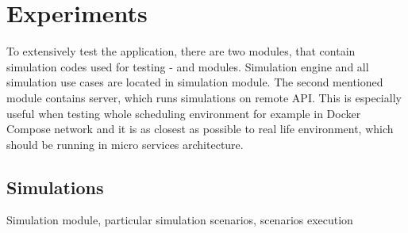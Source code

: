 \chapter{Experiments}\label{c:experiments}

To extensively test the application,
there are two modules, 
that contain simulation codes used for testing -
 and  modules.
Simulation engine and all simulation use cases are located in simulation module.
The second mentioned module contains server, 
which runs simulations on remote API. 
This is especially useful when testing whole scheduling environment for example in Docker Compose network
and it is as closest as possible to real life environment,
which should be running in micro services architecture.



\section{Simulations}
Simulation module, particular simulation scenarios, scenarios execution
